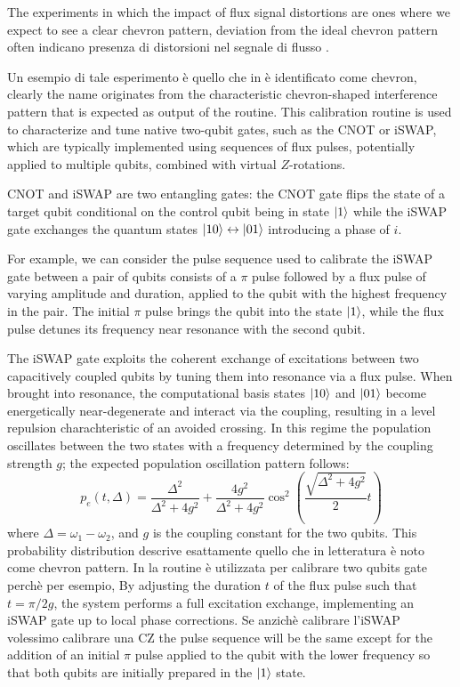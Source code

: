 The experiments in which the impact of flux signal distortions are ones where we expect to see a clear chevron pattern, deviation from the ideal chevron pattern often indicano presenza di distorsioni nel segnale di flusso \cite{Langford2017}.

Un esempio di tale esperimento è quello che in \Qibocal è identificato come chevron, clearly the name originates from the characteristic chevron-shaped interference pattern that is expected as output of the routine.
This calibration routine is used to characterize and tune native two-qubit gates, such as the CNOT or iSWAP, which are typically implemented using sequences of flux pulses, potentially applied to multiple qubits, combined with virtual $Z$-rotations.

CNOT and iSWAP are two entangling gates: the CNOT gate flips the state of a target qubit conditional on the control qubit being in state $\ket{1}$ while the iSWAP gate exchanges the quantum states $\ket{10}\leftrightarrow\ket{01}$ introducing a phase of $i$.

For example, we can consider the pulse sequence used to calibrate the iSWAP gate between a pair of qubits consists of a $\pi$ pulse followed by a flux pulse of varying amplitude and duration, applied to the qubit with the highest frequency in the pair. 
The initial $\pi$ pulse brings the qubit into the state $\ket{1}$, while the flux pulse detunes its frequency near resonance with the second qubit. 

The iSWAP gate exploits the coherent exchange of excitations between two capacitively coupled qubits by tuning them into resonance via a flux pulse. 
When brought into resonance, the computational basis states $\ket{10}$ and $\ket{01}$ become energetically near-degenerate and interact via the coupling, resulting in a level repulsion charachteristic of an avoided crossing.
In this regime the population oscillates between the two states with a frequency determined by the coupling strength $g$; the expected population oscillation pattern follows:
\begin{equation}
    p_e(t, \Delta) = \frac{\Delta^2}{\Delta^2 + 4g^2} + \frac{4g^2}{\Delta^2 + 4g^2} \cos^2\left(\frac{\sqrt{\Delta^2 + 4g^2}}{2}t\right)
\end{equation}
where $\Delta = \omega_1 - \omega_2$, and $g$ is the coupling constant for the two qubits. This probability distribution descrive esattamente quello che in letteratura è noto come chevron pattern.
In \Qibocal la routine è utilizzata per calibrare two qubits gate perchè per esempio, By adjusting the duration $t$ of the flux pulse such that $t=\pi/2g$, the system performs a full excitation exchange, implementing an iSWAP gate up to local phase corrections.
Se anzichè calibrare l'iSWAP volessimo calibrare una CZ the pulse sequence will be the same except for the addition of an initial $\pi$ pulse applied to the qubit with the lower frequency so that both qubits are initially prepared in the $\ket{1}$ state.

